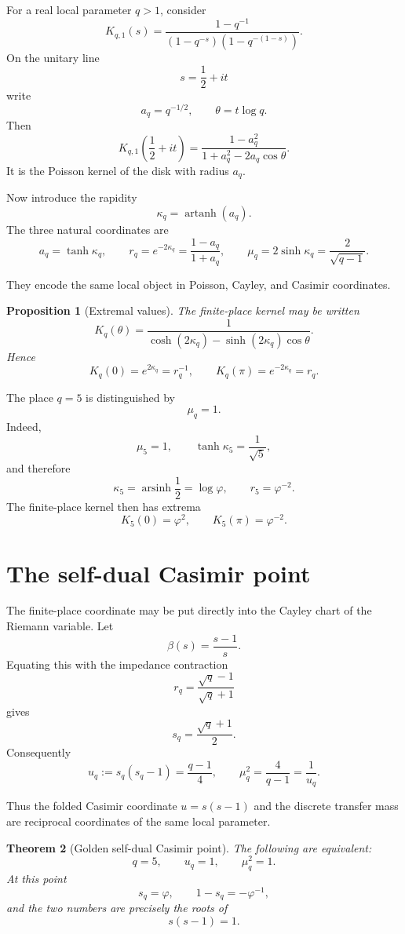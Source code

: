 \documentclass[11pt]{article}
\newtheorem{theorem}{Theorem}[section]
\newtheorem{proposition}[theorem]{Proposition}
\theoremstyle{definition}
\theoremstyle{remark}
\DeclareMathOperator{\artanh}{artanh}
\DeclareMathOperator{\arsinh}{arsinh}
\begin{document}
For a real local parameter \(q>1\), consider
\[
K_{q,1}(s)
=
\frac{1-q^{-1}}
{(1-q^{-s})(1-q^{-(1-s)})}.
\]
On the unitary line
\[
s=\frac12+it
\]
write
\[
a_q=q^{-1/2},
\qquad
\theta=t\log q.
\]
Then
\[
\boxed{
K_{q,1}\!\left(\frac12+it\right)
=
\frac{1-a_q^2}
{1+a_q^2-2a_q\cos\theta}.
}
\]
It is the Poisson kernel of the disk with radius \(a_q\).

Now introduce the rapidity
\[
\kappa_q=\artanh(a_q).
\]
The three natural coordinates are
\[
\boxed{
a_q=\tanh\kappa_q,\qquad
r_q=e^{-2\kappa_q}
=\frac{1-a_q}{1+a_q},
\qquad
\mu_q=2\sinh\kappa_q
=\frac{2}{\sqrt{q-1}}.
}
\]

They encode the same local object in Poisson, Cayley, and Casimir coordinates.

\begin{proposition}[Extremal values]
The finite-place kernel may be written
\[
K_q(\theta)
=
\frac{1}
{\cosh(2\kappa_q)-\sinh(2\kappa_q)\cos\theta}.
\]
Hence
\[
K_q(0)=e^{2\kappa_q}=r_q^{-1},
\qquad
K_q(\pi)=e^{-2\kappa_q}=r_q.
\]
\end{proposition}

The place \(q=5\) is distinguished by
\[
\mu_q=1.
\]
Indeed,
\[
\mu_5=1,\qquad
\tanh\kappa_5=\frac1{\sqrt5},
\]
and therefore
\[
\boxed{
\kappa_5=\arsinh\frac12=\log\varphi,
\qquad
r_5=\varphi^{-2}.
}
\]
The finite-place kernel then has extrema
\[
K_5(0)=\varphi^2,\qquad
K_5(\pi)=\varphi^{-2}.
\]


\section{The self-dual Casimir point}

The finite-place coordinate may be put directly into the Cayley chart of the Riemann variable.  Let
\[
\beta(s)=\frac{s-1}{s}.
\]
Equating this with the impedance contraction
\[
r_q=\frac{\sqrt q-1}{\sqrt q+1}
\]
gives
\[
\boxed{
s_q=\frac{\sqrt q+1}{2}.
}
\]
Consequently
\[
\boxed{
u_q:=s_q(s_q-1)=\frac{q-1}{4},
\qquad
\mu_q^2=\frac4{q-1}=\frac1{u_q}.
}
\]

Thus the folded Casimir coordinate \(u=s(s-1)\) and the discrete transfer mass are reciprocal coordinates of the same local parameter.

\begin{theorem}[Golden self-dual Casimir point]
The following are equivalent:
\[
q=5,\qquad
u_q=1,\qquad
\mu_q^2=1.
\]
At this point
\[
s_q=\varphi,
\qquad
1-s_q=-\varphi^{-1},
\]
and the two numbers are precisely the roots of
\[
s(s-1)=1.
\]
\end{theorem}
\end{document}
